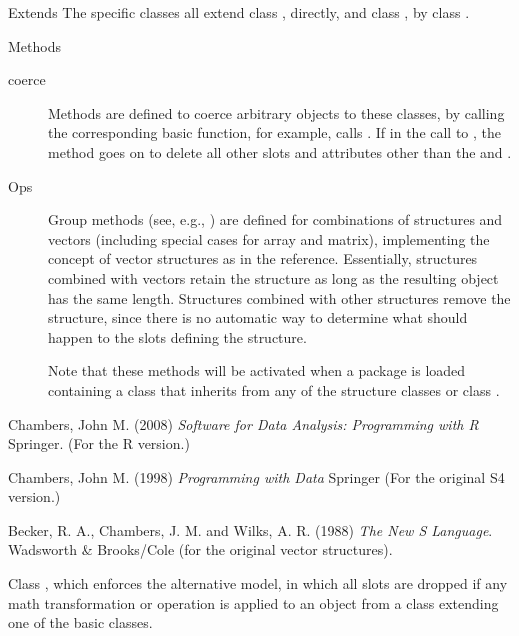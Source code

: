 %
\begin{Section}{Extends}
The specific classes all extend class , directly, and
class , by class .
\end{Section}
%
\begin{Section}{Methods}
\begin{description}

\item[coerce] Methods are defined to coerce arbitrary objects to
these classes, by calling the corresponding basic function, for
example,  calls .
If  in the call to , the method
goes on to delete all other slots and attributes other than the
 and .

\item[Ops] Group methods (see, e.g., )
are defined for combinations of structures and vectors (including
special cases for array and matrix), implementing the concept of
vector structures as in the reference.  Essentially, structures
combined with vectors retain the structure as long as the
resulting object has the same length.  Structures combined with
other structures remove the structure, since there is no
automatic way to determine what should happen to the slots
defining the structure.

Note that these methods will be activated when a package is loaded
containing a class that inherits from any of the structure
classes or class .


\end{description}

\end{Section}
%
\begin{References}\relax
Chambers, John M. (2008)
\emph{Software for Data Analysis: Programming with R}
Springer.  (For the R version.)

Chambers, John M. (1998)
\emph{Programming with Data}
Springer (For the original S4 version.)

Becker, R. A., Chambers, J. M. and Wilks, A. R. (1988)
\emph{The New S Language}.
Wadsworth \& Brooks/Cole (for the original vector structures).
\end{References}
%
\begin{SeeAlso}\relax
Class , which enforces the
alternative model, in which all slots are dropped if any math
transformation or operation is applied to an object from a class extending one of
the basic classes.
\end{SeeAlso}
